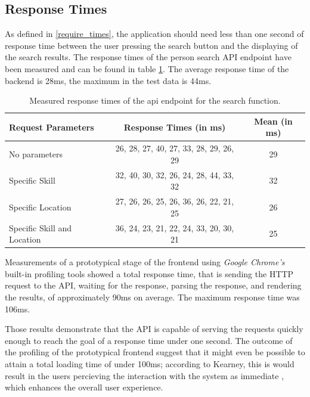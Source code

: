 \subsection{Response Times}
\label{resptime}
As defined in \ref{require_times}, the application should need less than one second of response time between the user pressing the search button and the
displaying of the search results. The response times of the person search API endpoint have been measured and can be found in table \ref{tab:responsetimes}.
The average response time of the backend is 28ms, the maximum in the test data is 44ms.

\begin{table}[H]
\centering
  \begin{tabular}{l|c|c|}
		Request Parameters                    & Response Times (in ms)                & Mean (in ms)\\
		\hline
		No parameters               & 26, 28, 27, 40, 27, 33, 28, 29, 26, 29 & 29\\
		Specific Skill              & 32, 40, 30, 32, 26, 24, 28, 44, 33, 32 & 32\\
		Specific Location           & 27, 26, 26, 25, 26, 36, 26, 22, 21, 25 & 26\\
		Specific Skill and Location & 36, 24, 23, 21, 22, 24, 33, 20, 30, 21 & 25\\
  \end{tabular}

\caption[API Response Times]{Measured response times of the api endpoint for the search function.}
\label{tab:responsetimes}
\end{table}

Measurements of a prototypical stage of the frontend using \textit{Google Chrome's} built-in profiling tools showed a total response time, that is sending the HTTP request to the API, waiting for the response, parsing the response, and rendering the results, of approximately 90ms on average. The maximum response time was 106ms.

Those results demonstrate that the API is capable of serving the requests quickly enough to reach the goal of a response time under one second. The outcome of the profiling of the prototypical frontend suggest that it might even be possible to attain a total loading time of under 100ms; according to Kearney, this is would result in the users percieving the interaction with the system as immediate \cite{RAIL}, which enhances the overall user experience.

